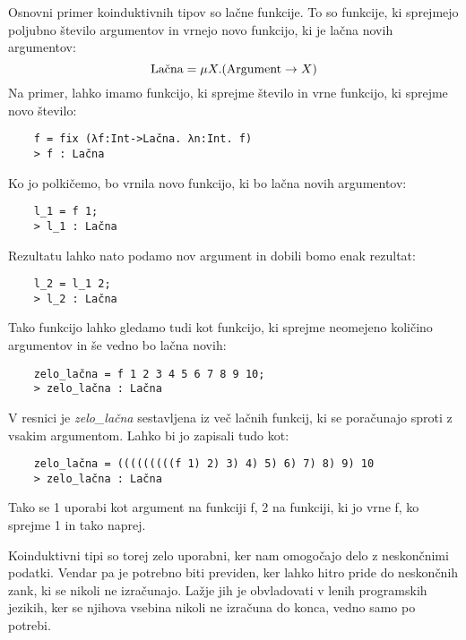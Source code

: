 \documentclass[12pt,a4paper,openany]{book}
\begin{document}
Osnovni primer koinduktivnih tipov so lačne funkcije. To so funkcije, ki sprejmejo poljubno število argumentov in vrnejo novo funkcijo, ki je lačna novih argumentov:
\begin{equation}
    \text{Lačna} = \mu X. (\text{Argument} \rightarrow X) \notag
\end{equation}
Na primer, lahko imamo funkcijo, ki sprejme število in vrne funkcijo, ki sprejme novo število:
\begin{lstlisting}
    f = fix (λf:Int->Lačna. λn:Int. f)
    > f : Lačna
\end{lstlisting}
Ko jo polkičemo, bo vrnila novo funkcijo, ki bo lačna novih argumentov:
\begin{lstlisting}
    l_1 = f 1;
    > l_1 : Lačna
\end{lstlisting}
Rezultatu lahko nato podamo nov argument in dobili bomo enak rezultat:
\begin{lstlisting}
    l_2 = l_1 2;
    > l_2 : Lačna  
\end{lstlisting}
Tako funkcijo lahko gledamo tudi kot funkcijo, ki sprejme neomejeno količino argumentov in še vedno bo lačna novih:
\begin{lstlisting}
    zelo_lačna = f 1 2 3 4 5 6 7 8 9 10;
    > zelo_lačna : Lačna
\end{lstlisting}
V resnici je \emph{zelo\_lačna} sestavljena iz več lačnih funkcij, ki se poračunajo sproti z vsakim argumentom. Lahko bi jo zapisali tudo kot:
\begin{lstlisting}
    zelo_lačna = (((((((((f 1) 2) 3) 4) 5) 6) 7) 8) 9) 10
    > zelo_lačna : Lačna
\end{lstlisting}
Tako se 1 uporabi kot argument na funkciji f, 2 na funkciji, ki jo vrne f, ko sprejme 1 in tako naprej.

Koinduktivni tipi so torej zelo uporabni, ker nam omogočajo delo z neskončnimi podatki. Vendar pa je potrebno biti previden, ker lahko hitro pride do neskončnih zank, ki se nikoli ne izračunajo. 
Lažje jih je obvladovati v lenih programskih jezikih, ker se njihova vsebina nikoli ne izračuna do konca, vedno samo po potrebi.
\end{document}
